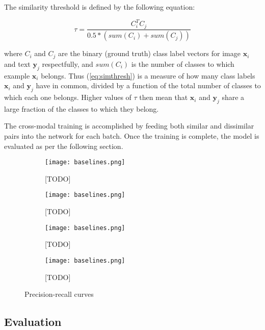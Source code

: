 \documentclass[letterpaper]{article}
\newcommand{\xii}{\mathbf{x}_i}
\newcommand{\yj}{\mathbf{y}_j}
\begin{document}
The similarity threshold is defined by the following equation:

\begin{equation}
\label{eq:simthresh}
\tau = \frac{C_i^T C_j}{0.5 * (sum(C_i) + sum(C_j)) }
\end{equation}

where $ C_i $ and $ C_j $ are the binary (ground truth) class label vectors for image $ \xii $ and text $ \yj $ respectfully, and $ sum(C_i) $ is the number of classes to which example $ \xii $ belongs. Thus (\ref{eq:simthresh}) is a measure of how many class labels $ \xii $ and $ \yj $ have in common, divided by a function of the total number of classes to which each one belongs. Higher values of $ \tau $ then mean that $ \xii $ and $ \yj $ share a large fraction of the classes to which they belong.

The cross-modal training is accomplished by feeding both similar and dissimilar pairs into the network for each batch. Once the training is complete, the model is evaluated as per the following section.

\begin{figure*}[]
	
	\begin{subfigure}{0.24\textwidth}
		\texttt{[image: baselines.png]}
		\caption{[TODO]}
	\end{subfigure}
	\begin{subfigure}{0.24\textwidth}
		\texttt{[image: baselines.png]}
		\caption{[TODO]}
	\end{subfigure}
	\begin{subfigure}{0.24\textwidth}
		\texttt{[image: baselines.png]}
		\caption{[TODO]}
	\end{subfigure}
	\begin{subfigure}{0.24\textwidth}
		\texttt{[image: baselines.png]}
		\caption{[TODO]}
	\end{subfigure}
	\caption{\label{fig:precrec}Precision-recall curves}
\end{figure*}

\subsection{Evaluation}
\end{document}
